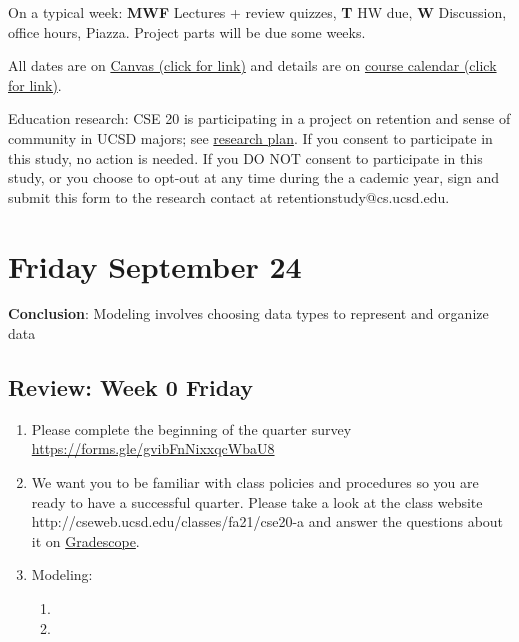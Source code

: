 \documentclass[12pt, oneside]{article}
\begin{document}
On a typical week: {\bf MWF} Lectures + review quizzes, {\bf T} HW due, {\bf W} Discussion, office hours, Piazza. 
Project parts will be due some weeks.

All dates are on \href{https://canvas.ucsd.edu/}{Canvas (click for link)} and details are on
 \href{https://discrete-math-for-cs.github.io/website/overview_calendar.html}{course calendar (click for link)}.

Education research: CSE 20 is participating in a project on retention and sense of community 
in UCSD majors; see \href{https://discrete-math-for-cs.github.io/files/CSInclusiveMentoringConsentFormNonCSEDataAnalysis.pdf}{research plan}. If you consent to participate in this study, no action is needed. 
If you DO NOT consent to participate in this study, or you choose to opt-out at any time during the a
cademic year, sign and submit this form to the research contact at retentionstudy@cs.ucsd.edu.


\newpage
\section*{Friday September 24}



{\bf Conclusion}: Modeling involves choosing data types to represent and organize data

\newpage
\subsection*{Review: Week 0 Friday}
\begin{enumerate}
\item Please complete the beginning of the quarter survey \href{https://forms.gle/gvibFnNixxqcWbaU8}{https://forms.gle/gvibFnNixxqcWbaU8}
\item We want you to be familiar with class policies and procedures so you are ready to have a successful quarter. 
Please take a look at the class website http://cseweb.ucsd.edu/classes/fa21/cse20-a
and answer the questions about it on \href{http://gradescope.com}{Gradescope}.
\item Modeling: 
\begin{enumerate}
    \item {}
    \item {}
\end{enumerate}
\end{enumerate}
\newpage
\end{document}
